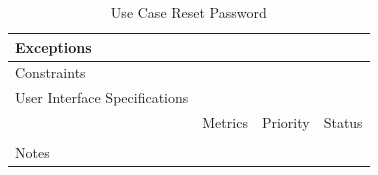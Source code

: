 \begin{table}[H]
\begin{tabularx}{\linewidth}{|l|X|X|X|}
            \hline Exceptions                    & \multicolumn{3}{l|}{}                                                                                 \\

            \hline Constraints                   & \multicolumn{3}{l|}{}                                                                                 \\

            \hline User Interface Specifications & \multicolumn{3}{l|}{}                                                                                 \\

            \hline \multirow{2}{*}{}             & Metrics                                                                           & Priority & Status \\
            \cline{2-4}                          &                                                                                   &          &        \\
            \hline Notes                         & \multicolumn{3}{l|}{}                                                                                 \\
            \hline
      \end{tabularx}
      \caption{Use Case Reset Password}
      \label{tab:use_case_reset_password}
\end{table}

